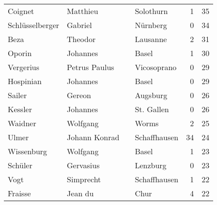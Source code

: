 \documentclass[10pt,a4paper,landscape]{article}
\begin{document}
\begin{longtable}{llllrr}
                  Coignet &                           Matthieu &             &                                   Solothurn &          1 &        35 \\
          Schlüsselberger &                            Gabriel &             &                                    Nürnberg &          0 &        34 \\
                     Beza &                            Theodor &             &                                    Lausanne &          2 &        31 \\
                   Oporin &                           Johannes &             &                                       Basel &          1 &        30 \\
                Vergerius &                      Petrus Paulus &             &                                 Vicosoprano &          0 &        29 \\
                Hospinian &                           Johannes &             &                                       Basel &          0 &        29 \\
                   Sailer &                             Gereon &             &                                    Augsburg &          0 &        26 \\
                  Kessler &                           Johannes &             &                                  St. Gallen &          0 &        26 \\
                  Waidner &                           Wolfgang &             &                                       Worms &          2 &        25 \\
                    Ulmer &                      Johann Konrad &             &                                Schaffhausen &         34 &        24 \\
               Wissenburg &                           Wolfgang &             &                                       Basel &          1 &        23 \\
                  Schüler &                          Gervasius &             &                                    Lenzburg &          0 &        23 \\
                     Vogt &                          Simprecht &             &                                Schaffhausen &          1 &        22 \\
                  Fraisse &                            Jean du &             &                                        Chur &          4 &        22 \\

\end{longtable}
\end{document}
